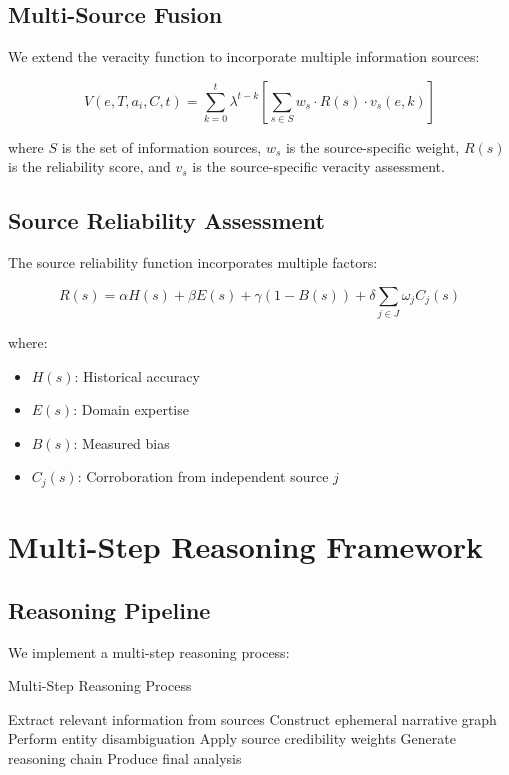 \documentclass[12pt, a4paper]{article}
\begin{document}
\subsection{Multi-Source Fusion}
We extend the veracity function to incorporate multiple information sources:

\begin{equation}
V(e, T, a_i, C, t) = \sum_{k=0}^t \lambda^{t-k} [\sum_{s \in S} w_s \cdot R(s) \cdot v_s(e, k)]
\end{equation}

where $S$ is the set of information sources, $w_s$ is the source-specific weight, $R(s)$ is the reliability score, and $v_s$ is the source-specific veracity assessment.

\subsection{Source Reliability Assessment}
The source reliability function incorporates multiple factors:

\begin{equation}
R(s) = \alpha H(s) + \beta E(s) + \gamma(1-B(s)) + \delta \sum_{j \in J} \omega_j C_j(s)
\end{equation}

where:
\begin{itemize}
    \item $H(s)$: Historical accuracy
    \item $E(s)$: Domain expertise
    \item $B(s)$: Measured bias
    \item $C_j(s)$: Corroboration from independent source $j$
\end{itemize}

\section{Multi-Step Reasoning Framework}
\subsection{Reasoning Pipeline}
We implement a multi-step reasoning process:

\begin{algorithm}[H]
\caption{Multi-Step Reasoning Process}
\begin{algorithmic}[1]
\State Extract relevant information from sources
\State Construct ephemeral narrative graph
\State Perform entity disambiguation
\State Apply source credibility weights
\State Generate reasoning chain
\State Produce final analysis
\end{algorithmic}
\end{algorithm}
\end{document}
